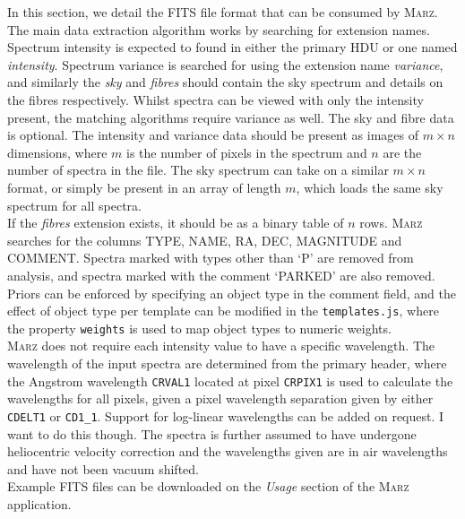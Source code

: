 \documentclass[iop]{emulateapj}
\newcommand{\red}{\color{red}}
\newcommand{\marz}{\textsc{Marz}}
\begin{document}
In this section, we detail the FITS file format that can be consumed by \marz{}. The main data extraction algorithm works by searching for extension names. Spectrum intensity is expected to found in either the primary HDU or one named \textit{intensity}. Spectrum variance is searched for using the extension name \textit{variance}, and similarly the \textit{sky} and \textit{fibres} should contain the sky spectrum and details on the fibres respectively. Whilst spectra can be viewed with only the intensity present, the matching algorithms require variance as well. The sky and fibre data is optional. The intensity and variance data should be present as images of $m\times n$ dimensions, where $m$ is the number of pixels in the spectrum and $n$ are the number of spectra in the file. The sky spectrum can take on a similar $m\times n$ format, or simply be present in an array of length $m$, which loads the same sky spectrum for all spectra.\\

If the \textit{fibres} extension exists, it should be as a binary table of $n$ rows. \marz{} searches for the columns TYPE, NAME, RA, DEC, MAGNITUDE and COMMENT. Spectra marked with types other than `P' are removed from analysis, and spectra marked with the comment `PARKED' are also removed. Priors can be enforced by specifying an object type in the comment field, and the effect of object type per template can be modified in the \verb;templates.js;, where the property \verb;weights; is used to map object types to numeric weights.\\


\marz{} does not require each intensity value to have a specific wavelength. The wavelength of the input spectra are determined from the primary header, where the Angstrom wavelength \verb;CRVAL1; located at pixel \verb;CRPIX1; is used to calculate the wavelengths for all pixels, given a pixel wavelength separation given by either \verb;CDELT1; or \verb;CD1_1;. Support for log-linear wavelengths can be added on request. {\red I want to do this though}. The spectra is further assumed to have undergone heliocentric velocity correction and the wavelengths given are in air wavelengths and have not been vacuum shifted.\\

Example FITS files can be downloaded on the \textit{Usage} section of the \marz{} application.
\end{document}
